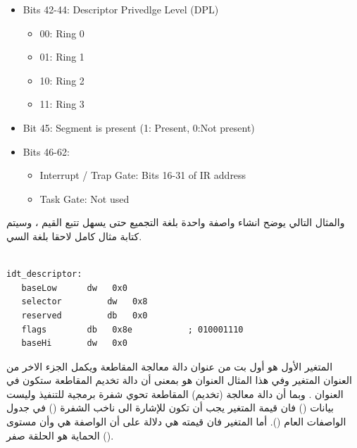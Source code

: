\documentclass[document.tex]{subfiles}
\begin{document}
\begin{english}
\begin{itemize}
\begin{itemize}
\end{itemize}

\item Bits 42-44: Descriptor Privedlge Level (DPL)
\begin{itemize}
\item 00: Ring 0
\item 01: Ring 1
\item 10: Ring 2
\item 11: Ring 3
\end{itemize}

\item Bit 45: Segment is present (1: Present, 0:Not present)
\item Bits 46-62: 
\begin{itemize}
\item Interrupt / Trap Gate: Bits 16-31 of IR address
\item Task Gate: Not used
\end{itemize}

\end{itemize}
\end{english}

والمثال التالي يوضح انشاء واصفة واحدة بلغة التجميع حتى يسهل تتبع القيم ، وسيتم كتابة مثال كامل لاحقا بلغة السي.

\begin{english}

\lstset{numberstyle=\tiny,numbers=left,stepnumber=1,numbersep=5pt,tabsize=2,extendedchars=true,breaklines=true,frame=b,showspaces=false, showtabs=false,xleftmargin=10pt,framexleftmargin=10pt,framexrightmargin=5pt,framexbottommargin=4pt,showstringspaces=false,language=[x86masm]Assembler}


\begin{lstlisting}[label=idt_desc,caption=\en{Example of interrupt descriptor}]

idt_descriptor:
   baseLow     	dw   0x0 
   selector      	dw   0x8
   reserved     	db   0x0 
   flags      	db   0x8e           ; 010001110
   baseHi      	dw   0x0

\end{lstlisting}
\end{english}

المتغير الأول  هو أول  بت من عنوان دالة معالجة المقاطعة  ويكمل الجزء الاخر من العنوان المتغير  وفي هذا المثال العنوان هو  بمعنى أن دالة تخديم المقاطعة ستكون في العنوان .  وبما أن دالة معالجة (تخديم) المقاطعة تحوي شفرة برمجية للتنفيذ وليست بيانات () فان قيمة المتغير  يجب أن تكون  للإشارة الى ناخب الشفرة () في جدول الواصفات العام ().  أما المتغير  فان قيمته هي  دلالة على أن الواصفة هي  وأن مستوى الحماية هو الحلقة صفر ().
\end{document}
